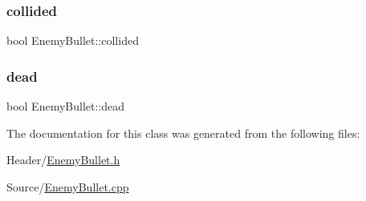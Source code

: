 \subsubsection{\texorpdfstring{collided}{collided}}
{\footnotesize\ttfamily bool Enemy\+Bullet\+::collided}

\mbox{\label{class_enemy_bullet_a0dfe3d06058023f6c5baf3c5fab4acbc}} 
\subsubsection{\texorpdfstring{dead}{dead}}
{\footnotesize\ttfamily bool Enemy\+Bullet\+::dead}



The documentation for this class was generated from the following files\+:\begin{DoxyCompactItemize}
\item 
Header/\mbox{\hyperlink{_enemy_bullet_8h}{Enemy\+Bullet.\+h}}\item 
Source/\mbox{\hyperlink{_enemy_bullet_8cpp}{Enemy\+Bullet.\+cpp}}\end{DoxyCompactItemize}
